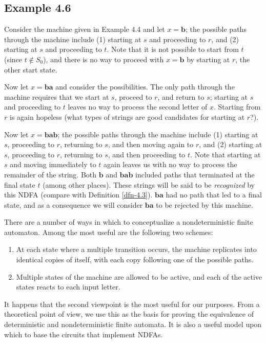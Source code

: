 \subsection*{Example 4.6}

Consider the machine given in Example 4.4 and let $x = \pmb{b}$; the possible
paths through the machine include (1) starting at $s$ and proceeding to $r$, and
(2) starting at $s$ and proceeding to $t$. Note that it is not possible to start
from $t$ (since $t \not \in S_0$), and there is no way to proceed with $x =
\pmb{b}$ by starting at $r$, the other start state.

Now let $x = \pmb{ba}$ and consider the possibilities. The only path through the
machine requires that we start at $s$, proceed to $r$, and return to $s$;
starting at $s$ and proceeding to $t$ leaves no way to process the second letter
of $x$. Starting from $r$ is again hopeless (what types of strings are good
candidates for starting at $r$?).

Now let $x = \pmb{bab}$; the possible paths through the machine include (1)
starting at $s$, proceeding to $r$, returning to $s$, and then moving again to
$r$, and (2) starting at $s$, proceeding to $r$, returning to $s$, and then
proceeding to $t$. Note that starting at $s$ and moving immediately to $t$ again
leaves us with no way to process the remainder of the string. Both $\pmb{b}$ and
$\pmb{bab}$ included paths that terminated at the final state $t$ (among other
places). These strings will be said to be \emph{recognized} by this NDFA
(compare with Definition \ref{dfn-4.3}). $\pmb{ba}$ had no path that led to a final state,
and as a consequence we will consider $\pmb{ba}$ to be rejected by this machine.

There are a number of ways in which to conceptualize a nondeterministic
finite automaton. Among the most useful are the following two schemes:

\begin{enumerate}
\item At each state where a multiple transition occurs, the machine replicates
into identical copies of itself, with each copy following one of the possible
paths.
\item Multiple states of the machine are allowed to be active, and each of the
active states reacts to each input letter.
\end{enumerate}

It happens that the second viewpoint is the most useful for our purposes. From
a theoretical point of view, we use this as the basis for proving the
equivalence of deterministic and nondeterministic finite automata. It is also a
useful model upon which to base the circuits that implement NDFAs.

